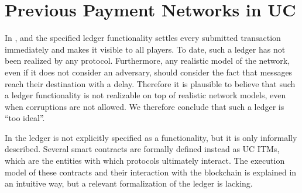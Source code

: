 \section{Previous Payment Networks in UC}
\label{appendix:relwork}
  In \cite{DBLP:conf/ccs/DziembowskiFH18}, \cite{perun} and
  \cite{Malavolta:2017:CPP:3133956.3134096} the specified ledger functionality
  settles every submitted transaction immediately and makes it visible to all
  players. To date, such a ledger has not been realized by any protocol.
  Furthermore, any realistic model of the network, even if it does not consider
  an adversary, should consider the fact that messages reach their destination
  with a delay. Therefore it is plausible to believe that such a ledger
  functionality is not realizable on top of realistic network models, even when
  corruptions are not allowed. We therefore conclude that such a ledger is ``too
  ideal''.

  In \cite{sprites} the ledger is not explicitly specified as a functionality,
  but it is only informally described. Several smart contracts are formally
  defined instead as UC ITMs, which are the entities with which protocols
  ultimately interact. The execution model of these contracts and their
  interaction with the blockchain is explained in an intuitive way, but a
  relevant formalization of the ledger is lacking.
